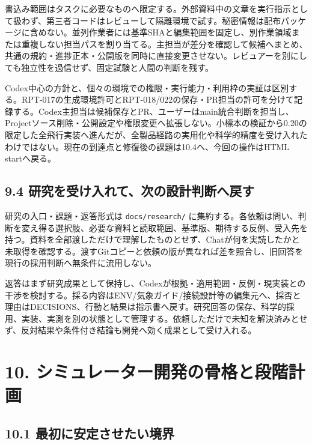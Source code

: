 \documentclass[11pt,a4paper]{article}
\begin{document}
書込み範囲はタスクに必要なものへ限定する。外部資料中の文章を実行指示として扱わず、第三者コードはレビューして隔離環境で試す。秘密情報は配布パッケージに含めない。並列作業者には基準SHAと編集範囲を固定し、別作業領域または重複しない担当パスを割り当てる。主担当が差分を確認して候補へまとめ、共通の規約・進捗正本・公開版を同時に直接変更させない。レビュアーを別にしても独立性を過信せず、固定試験と人間の判断を残す。

Codex中心の方針と、個々の環境での権限・実行能力・利用枠の実証は区別する。RPT-017の生成環境許可とRPT-018/022の保存・PR担当の許可を分けて記録する。Codex主担当は候補保存とPR、ユーザーはmain統合判断を担当し、Projectソース削除・公開設定や権限変更へ拡張しない。小標本の検証から0.20の限定した全飛行実装へ進んだが、全製品経路の実用化や科学的精度を受け入れたわけではない。現在の到達点と修復後の課題は10.4へ、今回の操作はHTML
startへ戻る。

\subsection{9.4
研究を受け入れて、次の設計判断へ戻す}\label{ux7814ux7a76ux3092ux53d7ux3051ux5165ux308cux3066ux6b21ux306eux8a2dux8a08ux5224ux65adux3078ux623bux3059}

研究の入口・課題・返答形式は \texttt{docs/research/}
に集約する。各依頼は問い、判断を変え得る選択肢、必要な資料と読取範囲、基準版、期待する反例、受入先を持つ。資料を全部渡しただけで理解したものとせず、Chatが何を実読したかと未取得を確認する。渡すGitコピーと依頼の版が異なれば差を照合し、旧回答を現行の採用判断へ無条件に流用しない。

返答はまず研究成果として保持し、Codexが根拠・適用範囲・反例・現実装との干渉を検討する。採る内容はENV/気象ガイド/接続設計等の編集元へ、採否と理由はDECISIONS、行動と結果は指示書へ戻す。研究回答の保存、科学的採用、実装、実測を別の状態として管理する。依頼しただけで未知を解決済みとせず、反対結果や条件付き結論も開発へ効く成果として受け入れる。

\section{10.
シミュレーター開発の骨格と段階計画}\label{ux30b7ux30dfux30e5ux30ecux30fcux30bfux30fcux958bux767aux306eux9aa8ux683cux3068ux6bb5ux968eux8a08ux753b}

\subsection{10.1
最初に安定させたい境界}\label{ux6700ux521dux306bux5b89ux5b9aux3055ux305bux305fux3044ux5883ux754c}
\end{document}
